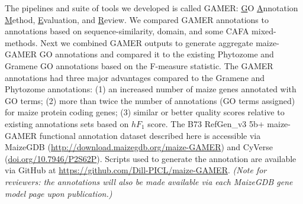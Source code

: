 The pipelines and suite of tools we developed is called GAMER: \underline{G}O \underline{A}nnotation \underline{M}ethod, \underline{E}valuation, and \underline{R}eview. We compared GAMER annotations to annotations based on sequence-similarity, domain, and some CAFA mixed-methods. Next we combined GAMER outputs to generate aggregate maize-GAMER GO annotations and compared it to the existing Phytozome and Gramene GO annotations based on the F-measure statistic. The GAMER annotations had three major advantages compared to the Gramene and Phytozome annotations: (1) an increased number of maize genes annotated with GO terms; (2) more than twice the number of annotations (GO terms assigned) for maize protein coding genes; (3) similar or better quality scores relative to  existing annotations sets based on $hF_1$ score. The B73 RefGen\_v3 5b+ maize-GAMER functional annotation dataset described here is accessible via MaizeGDB (\href{http://download.maizegdb.org/maize-GAMER}{http://download.maizegdb.org/maize-GAMER}) and CyVerse (\href{http://doi.org/10.7946/P2S62P}{doi.org/10.7946/P2S62P}). Scripts used to generate the annotation are available via GitHub at \href{https://github.com/Dill-PICL/maize-GAMER}{https://github.com/Dill-PICL/maize-GAMER}. \textit{(Note for reviewers: the annotations will also be made available via each MaizeGDB gene model page upon publication.)}